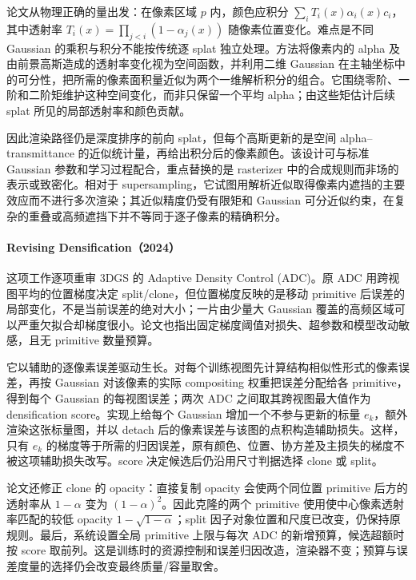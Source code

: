 论文从物理正确的量出发：在像素区域 $p$ 内，颜色应积分 $\sum_i T_i(x)\alpha_i(x)c_i$，其中透射率 $T_i(x)=\prod_{j<i}(1-\alpha_j(x))$ 随像素位置变化。难点是不同 Gaussian 的乘积与积分不能按传统逐 splat 独立处理。方法将像素内的 alpha 及由前景高斯造成的透射率变化视为空间函数，并利用二维 Gaussian 在主轴坐标中的可分性，把所需的像素面积量近似为两个一维解析积分的组合。它围绕零阶、一阶和二阶矩维护这种空间变化，而非只保留一个平均 alpha；由这些矩估计后续 splat 所见的局部透射率和颜色贡献。

因此渲染路径仍是深度排序的前向 splat，但每个高斯更新的是空间 alpha--transmittance 的近似统计量，再给出积分后的像素颜色。该设计可与标准 Gaussian 参数和学习过程配合，重点替换的是 rasterizer 中的合成规则而非场的表示或致密化。相对于 supersampling，它试图用解析近似取得像素内遮挡的主要效应而不进行多次渲染；其近似精度仍受有限矩和 Gaussian 可分近似约束，在复杂的重叠或高频遮挡下并不等同于逐子像素的精确积分。

\paragraph{Revising Densification（2024）\cite{2404_06109}}
这项工作逐项重审 3DGS 的 Adaptive Density Control (ADC)。原 ADC 用跨视图平均的位置梯度决定 split/clone，但位置梯度反映的是移动 primitive 后误差的局部变化，不是当前误差的绝对大小；一片由少量大 Gaussian 覆盖的高频区域可以严重欠拟合却梯度很小。论文也指出固定梯度阈值对损失、超参数和模型改动敏感，且无 primitive 数量预算。

它以辅助的逐像素误差驱动生长。对每个训练视图先计算结构相似性形式的像素误差，再按 Gaussian 对该像素的实际 compositing 权重把误差分配给各 primitive，得到每个 Gaussian 的每视图误差；两次 ADC 之间取其跨视图最大值作为 densification score。实现上给每个 Gaussian 增加一个不参与更新的标量 $e_k$，额外渲染这张标量图，并以 detach 后的像素误差与该图的点积构造辅助损失。这样，只有 $e_k$ 的梯度等于所需的归因误差，原有颜色、位置、协方差及主损失的梯度不被这项辅助损失改写。score 决定候选后仍沿用尺寸判据选择 clone 或 split。

论文还修正 clone 的 opacity：直接复制 opacity 会使两个同位置 primitive 后方的透射率从 $1-\alpha$ 变为 $(1-\alpha)^2$。因此克隆的两个 primitive 使用使中心像素透射率匹配的较低 opacity $1-\sqrt{1-\alpha}$；split 因子对象位置和尺度已改变，仍保持原规则。最后，系统设置全局 primitive 上限与每次 ADC 的新增预算，候选超额时按 score 取前列。这是训练时的资源控制和误差归因改造，渲染器不变；预算与误差度量的选择仍会改变最终质量/容量取舍。

